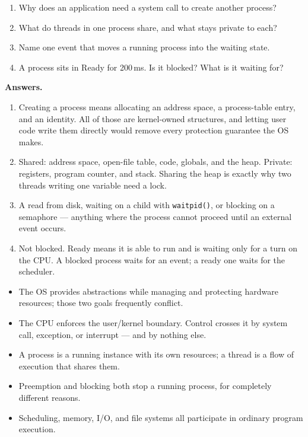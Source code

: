 

\begin{quickcheck}
\begin{enumerate}
  \item Why does an application need a system call to create another process?
  \item What do threads in one process share, and what stays private to each?
  \item Name one event that moves a running process into the waiting state.
  \item A process sits in Ready for 200\,ms. Is it blocked? What is it waiting for?
\end{enumerate}

\medskip\noindent\textbf{Answers.}
\begin{enumerate}
  \item Creating a process means allocating an address space, a process-table entry, and an identity. All of those are kernel-owned structures, and letting user code write them directly would remove every protection guarantee the OS makes.
  \item Shared: address space, open-file table, code, globals, and the heap. Private: registers, program counter, and stack. Sharing the heap is exactly why two threads writing one variable need a lock.
  \item A read from disk, waiting on a child with \texttt{waitpid()}, or blocking on a semaphore --- anything where the process cannot proceed until an external event occurs.
  \item Not blocked. Ready means it is able to run and is waiting only for a turn on the CPU. A blocked process waits for an event; a ready one waits for the scheduler.
\end{enumerate}
\end{quickcheck}

\begin{chapterrecap}
\begin{itemize}
  \item The OS provides abstractions while managing and protecting hardware resources; those two goals frequently conflict.
  \item The CPU enforces the user/kernel boundary. Control crosses it by system call, exception, or interrupt --- and by nothing else.
  \item A process is a running instance with its own resources; a thread is a flow of execution that shares them.
  \item Preemption and blocking both stop a running process, for completely different reasons.
  \item Scheduling, memory, I/O, and file systems all participate in ordinary program execution.
\end{itemize}
\end{chapterrecap}
